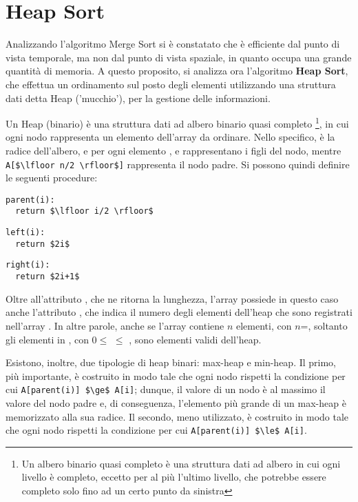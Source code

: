 \section{Heap Sort}
Analizzando l'algoritmo Merge Sort si è constatato che è efficiente dal punto di vista temporale, ma non dal punto di vista spaziale, in quanto occupa una grande quantità di memoria. A questo proposito, si analizza ora l'algoritmo \textbf{Heap Sort}, che effettua un ordinamento sul posto degli elementi utilizzando una struttura dati detta Heap ('mucchio'), per la gestione delle informazioni.

Un Heap (binario) è una struttura dati ad albero binario quasi completo \footnote{Un albero binario quasi completo è una struttura dati ad albero in cui ogni livello è completo, eccetto per al più l'ultimo livello, che potrebbe essere completo solo fino ad un certo punto da sinistra}, in cui ogni nodo rappresenta un elemento dell'array da ordinare. Nello specifico,  è la radice dell'albero, e per ogni elemento ,  e  rappresentano i figli del nodo, mentre \lstinline[mathescape]{A[$\lfloor n/2 \rfloor$]} rappresenta il nodo padre. Si possono quindi definire le seguenti procedure:

\begin{lstlisting}[mathescape=true]
parent(i):
  return $\lfloor i/2 \rfloor$
\end{lstlisting}
\begin{lstlisting}[mathescape=true]
left(i):
  return $2i$
\end{lstlisting}
\begin{lstlisting}[mathescape]
right(i):
  return $2i+1$
\end{lstlisting}

Oltre all'attributo , che ne ritorna la lunghezza, l'array  possiede in questo caso anche l'attributo , che indica il numero degli elementi dell'heap che sono registrati nell'array . In altre parole, anche se l'array contiene \(n\) elementi, con \(n\)=, soltanto gli elementi in , con \(0\le\)  \(\le\) , sono elementi validi dell'heap.

Esistono, inoltre, due tipologie di heap binari: max-heap e min-heap. Il primo, più importante, è costruito in modo tale che ogni nodo rispetti la condizione per cui \lstinline[mathescape]{A[parent(i)] $\ge$ A[i]}; dunque, il valore di un nodo è al massimo il valore del nodo padre e, di conseguenza, l'elemento più grande di un max-heap è memorizzato alla sua radice. Il secondo, meno utilizzato, è costruito in modo tale che ogni nodo rispetti la condizione per cui \lstinline[mathescape]{A[parent(i)] $\le$ A[i]}. 

